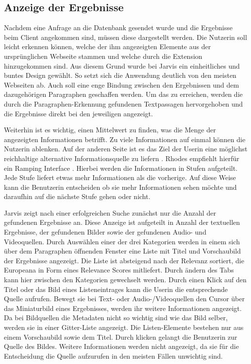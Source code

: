  \subsection{Anzeige der Ergebnisse}
 Nachdem eine Anfrage an die Datenbank gesendet wurde und die Ergebnisse beim Client angekommen sind, müssen diese dargestellt werden. Die Nutzerin soll leicht erkennen können, welche der ihm angezeigten Elemente aus der ursprünglichen Webseite stammen und welche durch die Extension hinzugekommen sind. Aus diesem Grund wurde bei Jarvis ein einheitliches und buntes Design gewählt. So setzt sich die Anwendung deutlich von den meisten Webseiten ab. Auch soll eine enge Bindung zwischen den Ergebnissen und dem dazugehörigen Paragraphen geschaffen werden. Um das zu erreichen, werden die durch die Paragraphen-Erkennung gefundenen Textpassagen hervorgehoben und die Ergebnisse direkt bei den jeweiligen angezeigt.

 Weiterhin ist es wichtig, einen Mittelwert zu finden, was die Menge der angezeigten Informationen betrifft. Zu viele Informationen auf einmal können die Nutzerin ablenken. Auf der anderen Seite ist es das Ziel der Userin eine möglichst reichhaltige alternative Informationsquelle zu liefern \cite{rhodes2000margin}. Rhodes empfiehlt hierfür ein Ramping Interface \cite{rhodes2000just}. Hierbei werden die Informationen in Stufen aufgeteilt. Jede Stufe liefert etwas mehr Informationen als die vorherige. Auf diese Weise kann die Benutzerin entscheiden ob sie mehr Informationen sehen möchte und daraufhin auf die nächste Stufe gehen oder nicht.

 Jarvis zeigt nach einer erfolgreichen Suche zunächst nur die Anzahl der gefundenen Ergebnisse an. Diese Anzeige ist aufgeteilt in Anzahl der textuellen Ergebnisse, der gefundenen Bilder sowie der gefundenen Audio- und Videoquellen. Durch Auswählen einer der drei Kategorien werden in einem sich über dem Paragraphen öffnenden Fenster eine Liste mit Titel und Vorschaubild der Ergebnisse angezeigt. Die Liste ist absteigend nach der Relevanz sortiert, die Europeana in Form eines Relevance Scores mitliefert. Durch ändern des Tabs kann hier zwischen den Kategorien gewechselt werden.
 Durch einen Klick auf den Titel oder das Bild eines Listeneintrages kann die Userin die entsprechende Quelle aufrufen. Bewegt sie bei Text- oder Audio-/Videoquellen den Cursor über das Miniaturbild eines Ergebnisses, werden ihr weitere Informationen angezeigt. Da bei Bildquellen die Metadaten nicht so wichtig sind wie das Bild selber, werden sie in einer Gitter-Liste angezeigt. Die Listen-Elemente bestehen nur aus einem Vorschaubild sowie dem Titel. Durch klicken gelangt die Benutzerin zur Quelle des Bildes. Weitere Informationen werden nicht angezeigt, da sie für die Entscheidung die Quelle aufzurufen in den meisten Fällen unwichtig sind.

